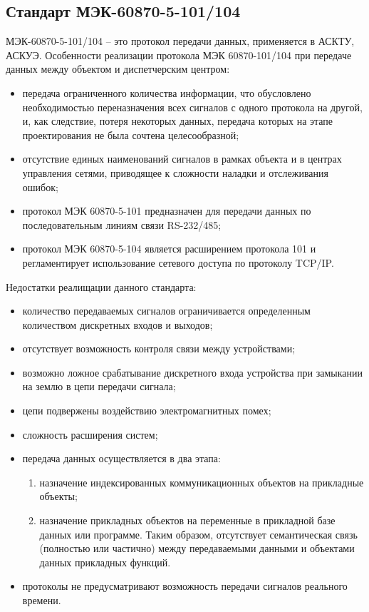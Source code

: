 \subsection{Стандарт МЭК-60870-5-101/104}

МЭК-60870-5-101/104 – это протокол передачи данных, применяется в АСКТУ, АСКУЭ. Особенности реализации протокола МЭК 60870-101/104 при передаче данных между объектом и диспетчерским центром:

\begin{itemize}
 \item передача ограниченного количества информации, что обусловлено необходимостью переназначения всех сигналов с одного протокола на другой, и, как следствие, потеря некоторых данных, передача которых на этапе проектирования не была сочтена целесообразной;
 \item отсутствие единых наименований сигналов в рамках объекта и в центрах управления сетями, приводящее к сложности наладки и отслеживания ошибок;
 \item протокол МЭК 60870-5-101 предназначен для передачи данных по последовательным линиям связи RS-232/485;
 \item протокол МЭК 60870-5-104 является расширением протокола 101 и регламентирует использование сетевого доступа по протоколу TCP/IP.
\end{itemize}

Недостатки реалищации данного стандарта:

\begin{itemize}
 \item количество передаваемых сигналов ограничивается определенным количеством дискретных входов и выходов;
 \item отсутствует возможность контроля связи между устройствами;
 \item возможно ложное срабатывание дискретного входа устройства при замыкании на землю в цепи передачи сигнала;
 \item цепи подвержены воздействию электромагнитных помех;
 \item сложность расширения систем;
 \item передача данных осуществляется в два этапа:
 \begin{enumerate}
  \item назначение индексированных коммуникационных объектов на прикладные объекты;
  \item  назначение прикладных объектов на переменные в прикладной базе данных или программе. Таким образом, отсутствует семантическая связь (полностью или частично) между передаваемыми данными и объектами данных прикладных функций.
 \end{enumerate}
 \item протоколы не предусматривают возможность передачи сигналов реального времени.
\end{itemize}

